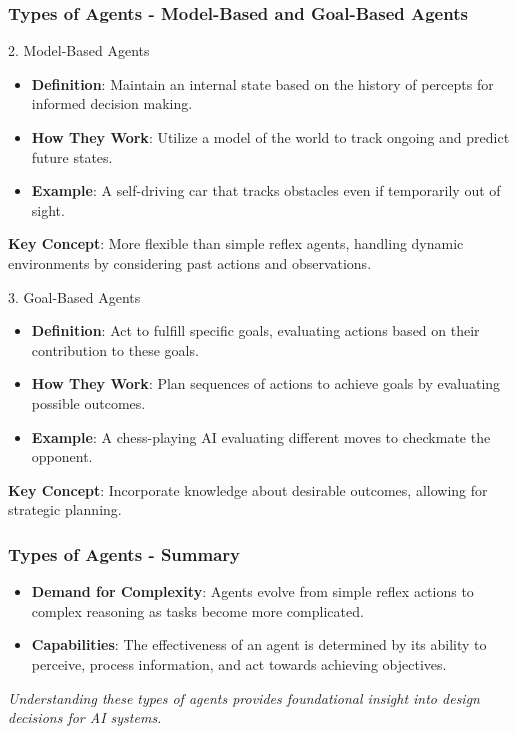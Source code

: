 \documentclass[aspectratio=169]{beamer}
\begin{document}
\begin{frame}[fragile]
    \frametitle{Types of Agents - Model-Based and Goal-Based Agents}
    \begin{block}{2. Model-Based Agents}
        \begin{itemize}
            \item \textbf{Definition}: Maintain an internal state based on the history of percepts for informed decision making.
            \item \textbf{How They Work}: Utilize a model of the world to track ongoing and predict future states.
            \item \textbf{Example}: A self-driving car that tracks obstacles even if temporarily out of sight.
        \end{itemize}
        
        \textbf{Key Concept}: More flexible than simple reflex agents, handling dynamic environments by considering past actions and observations.
    \end{block}

    \begin{block}{3. Goal-Based Agents}
        \begin{itemize}
            \item \textbf{Definition}: Act to fulfill specific goals, evaluating actions based on their contribution to these goals.
            \item \textbf{How They Work}: Plan sequences of actions to achieve goals by evaluating possible outcomes.
            \item \textbf{Example}: A chess-playing AI evaluating different moves to checkmate the opponent.
        \end{itemize}

        \textbf{Key Concept}: Incorporate knowledge about desirable outcomes, allowing for strategic planning.
    \end{block}
\end{frame}

\begin{frame}[fragile]
    \frametitle{Types of Agents - Summary}
    \begin{itemize}
        \item \textbf{Demand for Complexity}: Agents evolve from simple reflex actions to complex reasoning as tasks become more complicated.
        \item \textbf{Capabilities}: The effectiveness of an agent is determined by its ability to perceive, process information, and act towards achieving objectives.
    \end{itemize}
    
    \textit{Understanding these types of agents provides foundational insight into design decisions for AI systems.}
\end{frame}
\end{document}
